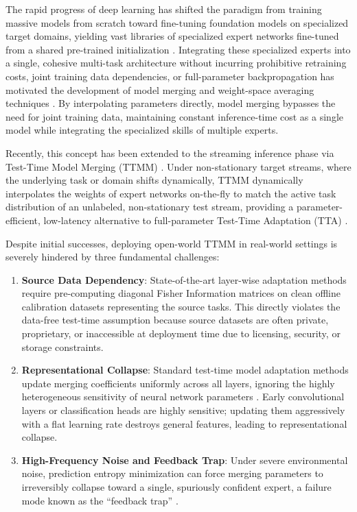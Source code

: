 \documentclass{article}
\theoremstyle{plain}
\theoremstyle{definition}
\theoremstyle{remark}
\begin{document}
The rapid progress of deep learning has shifted the paradigm from training massive models from scratch toward fine-tuning foundation models on specialized target domains, yielding vast libraries of specialized expert networks fine-tuned from a shared pre-trained initialization \cite{wortsman2022robust, ilharco2022editing}. Integrating these specialized experts into a single, cohesive multi-task architecture without incurring prohibitive retraining costs, joint training data dependencies, or full-parameter backpropagation has motivated the development of model merging and weight-space averaging techniques \cite{ties_merging, matena2022merging}. By interpolating parameters directly, model merging bypasses the need for joint training data, maintaining constant inference-time cost as a single model while integrating the specialized skills of multiple experts.

Recently, this concept has been extended to the streaming inference phase via Test-Time Model Merging (TTMM) \cite{yang2024test, hubotter2025local}. Under non-stationary target streams, where the underlying task or domain shifts dynamically, TTMM dynamically interpolates the weights of expert networks on-the-fly to match the active task distribution of an unlabeled, non-stationary test stream, providing a parameter-efficient, low-latency alternative to full-parameter Test-Time Adaptation (TTA) \cite{wang2021tent}. 

Despite initial successes, deploying open-world TTMM in real-world settings is severely hindered by three fundamental challenges:
\begin{enumerate}
    \item \textbf{Source Data Dependency}: State-of-the-art layer-wise adaptation methods require pre-computing diagonal Fisher Information matrices on clean offline calibration datasets representing the source tasks. This directly violates the data-free test-time assumption because source datasets are often private, proprietary, or inaccessible at deployment time due to licensing, security, or storage constraints.
    \item \textbf{Representational Collapse}: Standard test-time model adaptation methods update merging coefficients uniformly across all layers, ignoring the highly heterogeneous sensitivity of neural network parameters \cite{he2016deep}. Early convolutional layers or classification heads are highly sensitive; updating them aggressively with a flat learning rate destroys general features, leading to representational collapse.
    \item \textbf{High-Frequency Noise and Feedback Trap}: Under severe environmental noise, prediction entropy minimization can force merging parameters to irreversibly collapse toward a single, spuriously confident expert, a failure mode known as the ``feedback trap'' \cite{zhao2024feedback}.
\end{enumerate}
\end{document}
